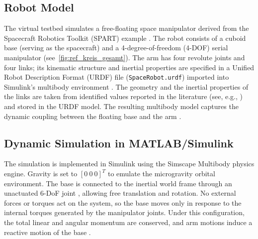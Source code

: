 \documentclass{ieeeaccess}
\begin{document}
\subsection{Robot Model} The virtual testbed simulates a free-floating space manipulator derived from
the Spacecraft Robotics Toolkit (SPART) example \cite{b9}. The robot consists of a cuboid base (serving as the
spacecraft) and a 4-degree-of-freedom (4-DOF) serial manipulator (see~\autoref{fig:ref_kreis_gesamt}). The arm
has four revolute joints and four links; its kinematic structure and inertial properties are specified in
a Unified Robot Description Format (URDF) file (\texttt{SpaceRobot.urdf}) imported into Simulink's
multibody environment \cite{b25,b26,b27}. The geometry and the inertial properties of the links are taken from identified values reported in the literature (see, e.g., \cite{b12}) and stored in the URDF model. The resulting multibody model captures the dynamic coupling between the floating base and the arm \cite{b6}.

\subsection{Dynamic Simulation in MATLAB/Simulink}\label{sec:sim} The simulation is implemented in Simulink using the
Simscape Multibody physics engine. Gravity is set to $[0~0~0]^T$ to emulate the microgravity
orbital environment. The base is connected to the inertial world frame through an unactuated 6-DoF joint \cite{b3}, allowing free translation and rotation. No external forces or torques act on
the system, so the base moves only in response to the internal torques generated by the manipulator joints. Under this configuration, the total linear and angular momentum are conserved, and arm motions induce a reactive motion of the base \cite{b3,b6,b28,b34,kaigom2011optimal}.
\end{document}
